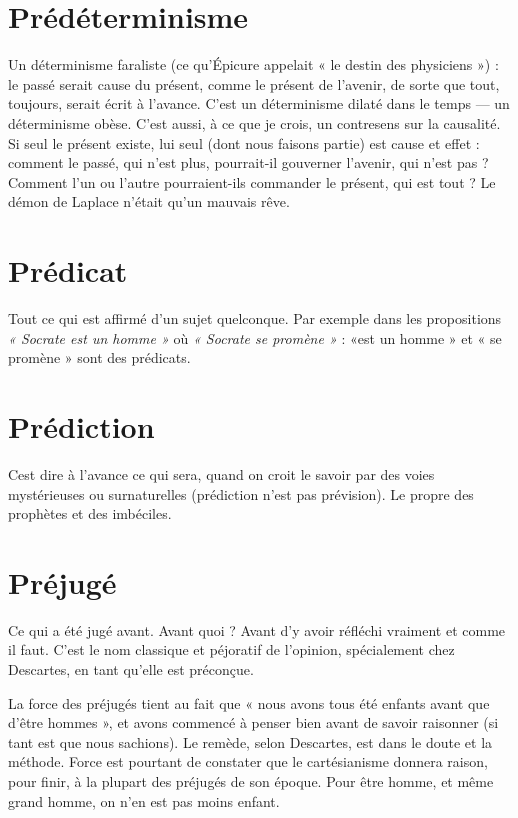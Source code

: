 \section{Prédéterminisme}
Un déterminisme faraliste (ce qu’Épicure appelait
« le destin des physiciens ») : le passé serait cause du
présent, comme le présent de l’avenir, de sorte que tout, toujours, serait écrit à
l'avance. C’est un déterminisme dilaté dans le temps — un déterminisme obèse.
C'est aussi, à ce que je crois, un contresens sur la causalité. Si seul le présent
existe, lui seul (dont nous faisons partie) est cause et effet : comment le passé,
qui n'est plus, pourrait-il gouverner l'avenir, qui n’est pas ? Comment l’un ou
l’autre pourraient-ils commander le présent, qui est tout ? Le démon de Laplace
n’était qu’un mauvais rêve.

\section{Prédicat}
Tout ce qui est affirmé d’un sujet quelconque. Par exemple
dans les propositions {\it « Socrate est un homme »} où {\it « Socrate se
promène »} : «est un homme » et « se promène » sont des prédicats.

\section{Prédiction}
Cest dire à l'avance ce qui sera, quand on croit le savoir par
des voies mystérieuses ou surnaturelles (prédiction n’est pas
prévision). Le propre des prophètes et des imbéciles.

\section{Préjugé}
Ce qui a été jugé avant. Avant quoi ? Avant d’y avoir réfléchi
vraiment et comme il faut. C’est le nom classique et péjoratif de
l'opinion, spécialement chez Descartes, en tant qu’elle est préconçue.

La force des préjugés tient au fait que « nous avons tous été enfants avant
que d’être hommes », et avons commencé à penser bien avant de savoir raisonner
(si tant est que nous sachions). Le remède, selon Descartes, est dans le
doute et la méthode. Force est pourtant de constater que le cartésianisme donnera
raison, pour finir, à la plupart des préjugés de son époque. Pour être
homme, et même grand homme, on n’en est pas moins enfant.


